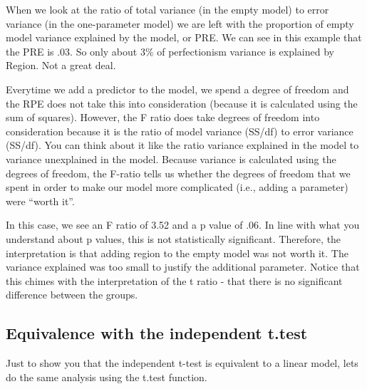 \documentclass[
]{article}
\newenvironment{Shaded}{\begin{snugshade}}{\end{snugshade}}
\newcommand{\AttributeTok}[1]{\textcolor[rgb]{0.13,0.29,0.53}{#1}}
\newcommand{\CommentTok}[1]{\textcolor[rgb]{0.56,0.35,0.01}{\textit{#1}}}
\newcommand{\ConstantTok}[1]{\textcolor[rgb]{0.56,0.35,0.01}{#1}}
\newcommand{\FunctionTok}[1]{\textcolor[rgb]{0.13,0.29,0.53}{\textbf{#1}}}
\newcommand{\NormalTok}[1]{#1}
\newcommand{\SpecialCharTok}[1]{\textcolor[rgb]{0.81,0.36,0.00}{\textbf{#1}}}
\begin{document}
When we look at the ratio of total variance (in the empty model) to
error variance (in the one-parameter model) we are left with the
proportion of empty model variance explained by the model, or PRE. We
can see in this example that the PRE is .03. So only about 3\% of
perfectionism variance is explained by Region. Not a great deal.

Everytime we add a predictor to the model, we spend a degree of freedom
and the RPE does not take this into consideration (because it is
calculated using the sum of squares). However, the F ratio does take
degrees of freedom into consideration because it is the ratio of model
variance (SS/df) to error variance (SS/df). You can think about it like
the ratio variance explained in the model to variance unexplained in the
model. Because variance is calculated using the degrees of freedom, the
F-ratio tells us whether the degrees of freedom that we spent in order
to make our model more complicated (i.e., adding a parameter) were
``worth it''.

In this case, we see an F ratio of 3.52 and a p value of .06. In line
with what you understand about p values, this is not statistically
significant. Therefore, the interpretation is that adding region to the
empty model was not worth it. The variance explained was too small to
justify the additional parameter. Notice that this chimes with the
interpretation of the t ratio - that there is no significant difference
between the groups.

\subsection{Equivalence with the independent
t.test}\label{equivalence-with-the-independent-t.test}

Just to show you that the independent t-test is equivalent to a linear
model, lets do the same analysis using the t.test function.

\begin{Shaded}
\end{Shaded}
\end{document}
